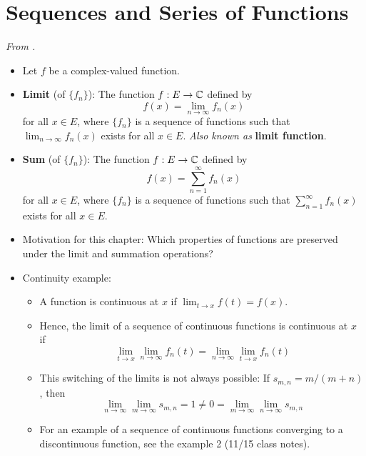 \documentclass[../../notes.tex]{subfiles}
\begin{document}
\section{Sequences and Series of Functions}
\emph{From \textcite{bib:Rudin}.}
\begin{itemize}
    \item {}Let $f$ be a complex-valued function.
    \item \textbf{Limit} (of $\{f_n\}$): The function $f:E\to\mathbb{C}$ defined by
    \begin{equation*}
        f(x) = \lim_{n\to\infty}f_n(x)
    \end{equation*}
    for all $x\in E$, where $\{f_n\}$ is a sequence of functions such that $\lim_{n\to\infty}f_n(x)$ exists for all $x\in E$. \emph{Also known as} \textbf{limit function}.
    \item \textbf{Sum} (of $\{f_n\}$): The function $f:E\to\mathbb{C}$ defined by
    \begin{equation*}
        f(x) = \sum_{n=1}^\infty f_n(x)
    \end{equation*}
    for all $x\in E$, where $\{f_n\}$ is a sequence of functions such that $\sum_{n=1}^\infty f_n(x)$ exists for all $x\in E$.
    \item Motivation for this chapter: Which properties of functions are preserved under the limit and summation operations?
    \item Continuity example:
    \begin{itemize}
        \item A function is continuous at $x$ if $\lim_{t\to x}f(t)=f(x)$.
        \item Hence, the limit of a sequence of continuous functions is continuous at $x$ if
        \begin{equation*}
            \lim_{t\to x}\lim_{n\to\infty}f_n(t) = \lim_{n\to\infty}\lim_{t\to x}f_n(t)
        \end{equation*}
        \item This switching of the limits is not always possible: If $s_{m,n}=m/(m+n)$, then
        \begin{equation*}
            \lim_{n\to\infty}\lim_{m\to\infty}s_{m,n} = 1
            \neq 0
            = \lim_{m\to\infty}\lim_{n\to\infty}s_{m,n}
        \end{equation*}
        \item For an example of a sequence of continuous functions converging to a discontinuous function, see the example 2 (11/15 class notes).
    \end{itemize}

\end{itemize}
\end{document}
